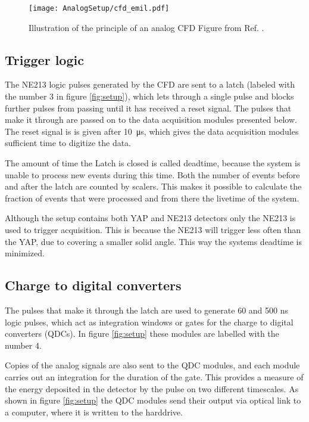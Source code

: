 \documentclass[main.tex]{subfiles}
\begin{document}
\begin{figure}[h]
    \centering
        \texttt{[image: AnalogSetup/cfd\_emil.pdf]}
        \caption[CFD trigger principle]{Illustration of the principle of an analog CFD Figure from Ref. \cite{rofors}.}
    \label{fig:cfd}
\end{figure}



\subsection{Trigger logic}
The NE213 logic pulses generated by the CFD are sent to a latch (labeled with the number 3 in figure \ref{fig:setup}), which lets through a single pulse and blocks further pulses from passing until it has received a reset signal. The pulses that make it through are passed on to the data acquisition modules presented below. The reset signal is is given after \SI{10}{\micro\second}, which gives the data acquisition modules sufficient time to digitize the data.

The amount of time the Latch is closed is called deadtime, because the system is unable to process new events during this time. Both the number of events before and after the latch are counted by scalers. This makes it possible to calculate the fraction of events that were processed and from there the livetime of the system.

Although the setup contains both YAP and NE213 detectors only the NE213 is used to trigger acquisition. This is because the NE213 will trigger less often than the YAP, due to covering a smaller solid angle. This way the systems deadtime is minimized.

\subsection{Charge to digital converters}
The pulses that make it through the latch are used to generate 60 and 500 ns logic pulses, which act as integration windows or gates for the charge to digital converters (QDCs). In figure \ref{fig:setup} these modules are labelled with the number 4.

Copies of the analog signals are also sent to the QDC modules, and each module carries out an integration for the duration of the gate. This provides a measure of the energy deposited in the detector by the pulse on two different timescales. As shown in figure \ref{fig:setup} the QDC modules send their output via optical link to a computer, where it is written to the harddrive.
\end{document}
